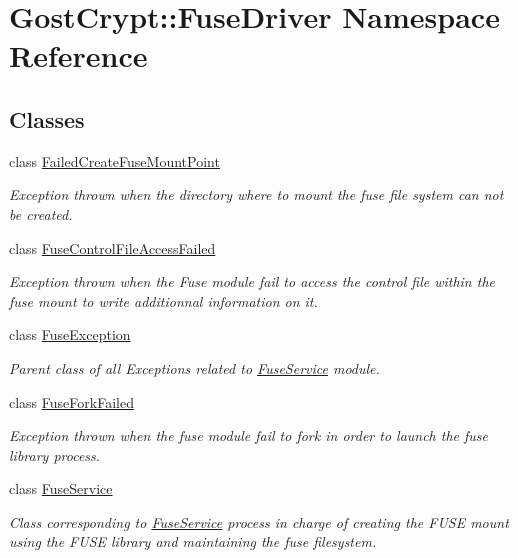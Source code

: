 \hypertarget{namespace_gost_crypt_1_1_fuse_driver}{}\section{Gost\+Crypt\+:\+:Fuse\+Driver Namespace Reference}
\label{namespace_gost_crypt_1_1_fuse_driver}
\subsection*{Classes}
\begin{DoxyCompactItemize}
\item 
class \hyperlink{class_gost_crypt_1_1_fuse_driver_1_1_failed_create_fuse_mount_point}{Failed\+Create\+Fuse\+Mount\+Point}
\begin{DoxyCompactList}\small\item\em Exception thrown when the directory where to mount the fuse file system can not be created. \end{DoxyCompactList}\item 
class \hyperlink{class_gost_crypt_1_1_fuse_driver_1_1_fuse_control_file_access_failed}{Fuse\+Control\+File\+Access\+Failed}
\begin{DoxyCompactList}\small\item\em Exception thrown when the Fuse module fail to access the control file within the fuse mount to write additionnal information on it. \end{DoxyCompactList}\item 
class \hyperlink{class_gost_crypt_1_1_fuse_driver_1_1_fuse_exception}{Fuse\+Exception}
\begin{DoxyCompactList}\small\item\em Parent class of all Exceptions related to \hyperlink{class_gost_crypt_1_1_fuse_driver_1_1_fuse_service}{Fuse\+Service} module. \end{DoxyCompactList}\item 
class \hyperlink{class_gost_crypt_1_1_fuse_driver_1_1_fuse_fork_failed}{Fuse\+Fork\+Failed}
\begin{DoxyCompactList}\small\item\em Exception thrown when the fuse module fail to fork in order to launch the fuse library process. \end{DoxyCompactList}\item 
class \hyperlink{class_gost_crypt_1_1_fuse_driver_1_1_fuse_service}{Fuse\+Service}
\begin{DoxyCompactList}\small\item\em Class corresponding to \hyperlink{class_gost_crypt_1_1_fuse_driver_1_1_fuse_service}{Fuse\+Service} process in charge of creating the F\+U\+SE mount using the F\+U\+SE library and maintaining the fuse filesystem. \end{DoxyCompactList}\item 

\end{DoxyCompactItemize}

